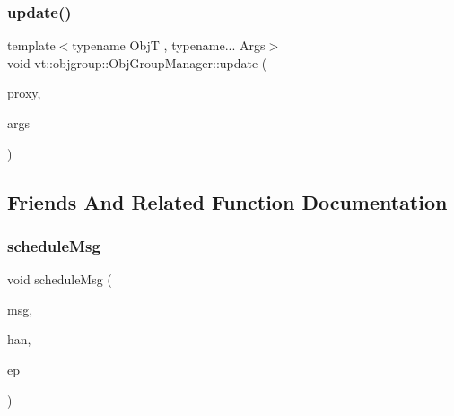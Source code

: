 \mbox{\label{structvt_1_1objgroup_1_1_obj_group_manager_a36d8749cf4f42e6b912159e9b4f959d6}} 
\subsubsection{\texorpdfstring{update()}{update()}\hspace{0.1cm}{\footnotesize\ttfamily [2/2]}}
{\footnotesize\ttfamily template$<$typename ObjT , typename... Args$>$ \\
void vt\+::objgroup\+::\+Obj\+Group\+Manager\+::update (\begin{DoxyParamCaption}\item[{\hyperlink{structvt_1_1objgroup_1_1_obj_group_manager_aea65eef52f240a52210132eef5ce591f}{Proxy\+Type}$<$ ObjT $>$}]{proxy,  }\item[{Args \&\&...}]{args }\end{DoxyParamCaption})}



\subsection{Friends And Related Function Documentation}
\mbox{\label{structvt_1_1objgroup_1_1_obj_group_manager_a151e47a8b9063752ff0a93f18e8c4a38}} 
\subsubsection{\texorpdfstring{schedule\+Msg}{scheduleMsg}}
{\footnotesize\ttfamily void schedule\+Msg (\begin{DoxyParamCaption}\item[{\hyperlink{namespacevt_a54674b9f819f4f3a652c6f78d9b62aaf}{Msg\+Virtual\+Ptr\+Any}}]{msg,  }\item[{\hyperlink{namespacevt_af64846b57dfcaf104da3ef6967917573}{Handler\+Type}}]{han,  }\item[{\hyperlink{namespacevt_a985a5adf291c34a3ca263b3378388236}{Epoch\+Type}}]{ep }\end{DoxyParamCaption})\hspace{0.3cm}{\ttfamily [friend]}}



